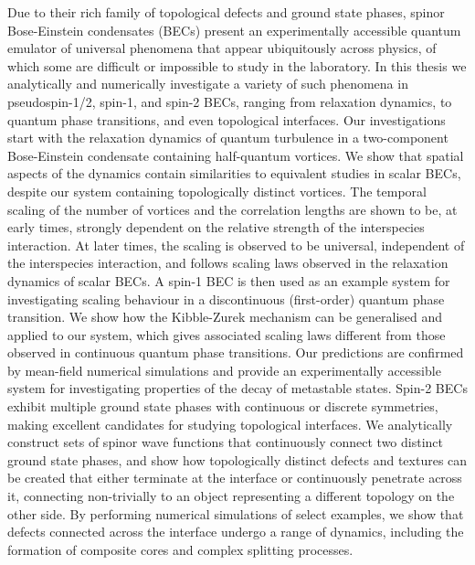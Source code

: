 Due to their rich family of topological defects and ground state phases, spinor
Bose-Einstein condensates (BECs) present an experimentally accessible quantum
emulator of universal phenomena that appear ubiquitously across physics, of
which some are difficult or impossible to study in the laboratory.
In this thesis we analytically and numerically investigate a variety of such
phenomena in pseudospin-1/2, spin-1, and spin-2 BECs, ranging from relaxation
dynamics, to quantum phase transitions, and even topological interfaces. 
Our investigations start with the relaxation dynamics of quantum turbulence in a
two-component Bose-Einstein condensate containing half-quantum vortices.
We show that spatial aspects of the dynamics contain similarities to equivalent
studies in scalar BECs, despite our system containing topologically distinct
vortices.
The temporal scaling of the number of vortices and the correlation lengths are
shown to be, at early times, strongly dependent on the relative strength of the
interspecies interaction.
At later times, the scaling is observed to be universal, independent
of the interspecies interaction, and follows scaling laws observed in the
relaxation dynamics of scalar BECs.
A spin-1 BEC is then used as an example system for investigating scaling
behaviour in a discontinuous (first-order) quantum phase transition.
We show how the Kibble-Zurek mechanism can be generalised and applied to our
system, which gives associated scaling laws different from those observed in
continuous quantum phase transitions.
Our predictions are confirmed by mean-field numerical simulations and provide
an experimentally accessible system for investigating properties of the decay of
metastable states.
Spin-2 BECs exhibit multiple ground state phases with continuous or discrete
symmetries, making excellent candidates for studying topological interfaces.
We analytically construct sets of spinor wave functions that continuously
connect two distinct ground state phases, and show how topologically distinct
defects and textures can be created that either terminate at the interface or
continuously penetrate across it, connecting non-trivially to an object
representing a different topology on the other side.
By performing numerical simulations of select examples, we show that defects
connected across the interface undergo a range of dynamics, including the
formation of composite cores and complex splitting processes.
